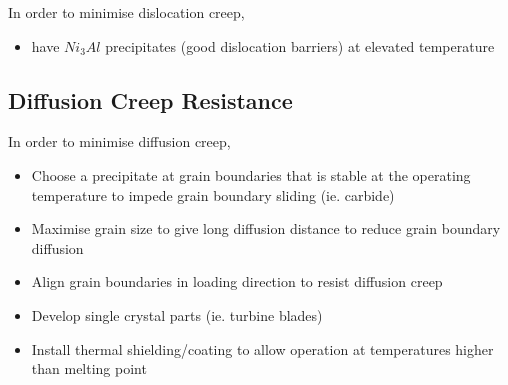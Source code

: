 In order to minimise dislocation creep,
\begin{itemize}
  \item have $Ni_3Al$ precipitates (good dislocation barriers) at elevated temperature
\end{itemize}


\subsection{Diffusion Creep Resistance} %
\label{sub:diffusion_creep_resistance}

In order to minimise diffusion creep,
\begin{itemize}
  \item Choose a precipitate at grain boundaries that is stable at the operating temperature to impede grain boundary sliding (ie. carbide)
  \item Maximise grain size to give long diffusion distance to reduce grain boundary diffusion
  \item Align grain boundaries in loading direction to resist diffusion creep
  \item Develop single crystal parts (ie. turbine blades)
  \item Install thermal shielding/coating to allow operation at temperatures higher than melting point
\end{itemize}




